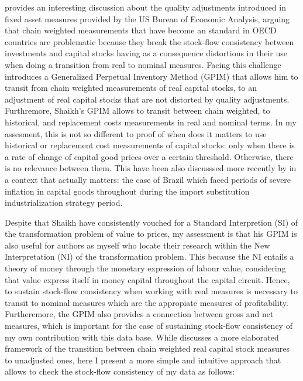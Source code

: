 \cite{Shaikh2016} provides an interesting discussion about the quality adjustments introduced in fixed asset measures provided by the US Bureau of Economic Analysis, arguing that chain weighted measurements that have become an standard in OECD countries are problematic because they break the stock-flow consistency between investments and capital stocks having as a consequence distortions in their use when doing a transition from real to nominal measures. Facing this challenge \cite{Shaikh2016} introduces a Generalized Perpetual Inventory Method (GPIM) that allows him to transit from chain weighted measurements of real capital stocks, to an adjustment of real capital stocks that are not distorted by quality adjustments. Furthremore, Shaikh's GPIM allows to transit between chain weighted, to historical, and replacement costs measurements in real and nominal terms. In my assesment, this is not so different to \citet{Basu2013} proof of when does it matters to use historical or replacement cost measurements of capital stocks: only when there is a rate of change of capital good prices over a certain threshold. Otherwise, there is no relevance between them. This have been also discusssed more recently by \citet{Marquetti2010} in a context that actually matters: the case of Brazil which faced periods of severe inflation in capital goods throughout during the import substitution industrialization strategy period. 

Despite that Shaikh have consistently vouched for a Standard Interpretion (SI) of the transformation problem of value to prices, my assessment is that his GPIM is also useful for authors as myself who locate their research within the New Interpretation (NI) of the transformation problem. This because the NI entails a theory of money through the monetary expression of labour value, considering that value express itself in money capital throughout the capital circuit. Hence, to sustain stock-flow consistency when working with real measures is necessary to transit to nominal measures which are the appropiate measures of profitability. Furtheremore, the GPIM also provides a connection between gross and net measures, which is important for the case of sustaining stock-flow consistency of my own contribution with this data base.  While \citet{Shaikh2016} discusses a more elaborated framework of the transition between chain weighted real capital stock measures to unadjusted ones, here I present a more simple and intuitive approach that allows to check the stock-flow consistency of my data as follows:


